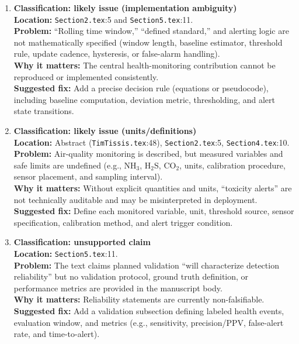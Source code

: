 \documentclass[11pt]{article}
\begin{document}
\begin{enumerate}[leftmargin=*,label=\textbf{T\arabic*.}]
  \item \textbf{Classification: likely issue (implementation ambiguity)}\\
  \textbf{Location:} \texttt{Section2.tex}:5 and \texttt{Section5.tex}:11.\\
  \textbf{Problem:} ``Rolling time window,'' ``defined standard,'' and alerting logic are not mathematically specified (window length, baseline estimator, threshold rule, update cadence, hysteresis, or false-alarm handling).\\
  \textbf{Why it matters:} The central health-monitoring contribution cannot be reproduced or implemented consistently.\\
  \textbf{Suggested fix:} Add a precise decision rule (equations or pseudocode), including baseline computation, deviation metric, thresholding, and alert state transitions.

  \item \textbf{Classification: likely issue (units/definitions)}\\
  \textbf{Location:} Abstract (\texttt{TimTissis.tex}:48), \texttt{Section2.tex}:5, \texttt{Section4.tex}:10.\\
  \textbf{Problem:} Air-quality monitoring is described, but measured variables and safe limits are undefined (e.g., NH$_3$, H$_2$S, CO$_2$, units, calibration procedure, sensor placement, and sampling interval).\\
  \textbf{Why it matters:} Without explicit quantities and units, ``toxicity alerts'' are not technically auditable and may be misinterpreted in deployment.\\
  \textbf{Suggested fix:} Define each monitored variable, unit, threshold source, sensor specification, calibration method, and alert trigger condition.

  \item \textbf{Classification: unsupported claim}\\
  \textbf{Location:} \texttt{Section5.tex}:11.\\
  \textbf{Problem:} The text claims planned validation ``will characterize detection reliability'' but no validation protocol, ground truth definition, or performance metrics are provided in the manuscript body.\\
  \textbf{Why it matters:} Reliability statements are currently non-falsifiable.\\
  \textbf{Suggested fix:} Add a validation subsection defining labeled health events, evaluation window, and metrics (e.g., sensitivity, precision/PPV, false-alert rate, and time-to-alert).


\end{enumerate}
\end{document}
